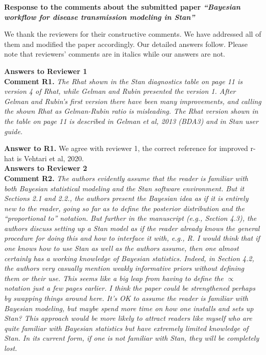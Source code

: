 \documentclass[12pt]{article}
\newcounter{question}
\newcommand{\name}{00}
\newcommand{\question}[1]{\stepcounter{question} \noindent \textbf{Comment \name.\thequestion} \emph{#1} }
\newcommand{\answer}[1]{\noindent \textbf{Answer to \name.\thequestion} #1 \mbox{}\\}
\newcommand{\newperson}[2]{\renewcommand{\name}{#2} \setcounter{question}{0} \newpage \noindent \textbf{\Large Answers to #1} \\}
\begin{document}
	
	{\large \textbf{Response to the comments about
			the submitted paper \emph{``Bayesian workflow for disease transmission modeling in
				Stan''
		}}}
	
	\vspace{3em}
	
	
	We thank the reviewers for their constructive comments. We have
	addressed all of them and modified the paper accordingly. Our
	detailed answers follow. 
	Please note that reviewers' comments are in italics while our
	answers are not. 
	
	
	\newperson{Reviewer 1}{R1}
	
%	
	
	\question{The Rhat shown in the Stan diagnostics table on page 11 is version 4 of Rhat, while Gelman and Rubin presented the version 1. After Gelman and Rubin's first version there have been many improvements, and calling the shown Rhat as Gelman-Rubin ratio is misleading. The Rhat version shown in the table on page 11 is described in Gelman et al, 2013 (BDA3) and in Stan user guide.}
	
	\answer{We agree with reviewer 1, the correct reference for improved r-hat is Vehtari et al, 2020.}
	
	\newperson{Reviewer 2}{R2}
	
	\question{The authors evidently assume that the reader is familiar with both Bayesian statistical
		modeling and the Stan software environment. But it Sections 2.1 and 2.2., the authors
		present the Bayesian idea as if it is entirely new to the reader, going so far as to
		define the posterior distribution and the “proportional to” notation. But further in the
		manuscript (e.g., Section 4.3), the authors discuss setting up a Stan model as if the
		reader already knows the general procedure for doing this and how to interface it with,
		e.g., R. I would think that if one knows how to use Stan as well as the authors assume,
		then one almost certainly has a working knowledge of Bayesian statistics. Indeed,
		in Section 4.2, the authors very casually mention weakly informative priors without
		defining them or their use. This seems like a big leap from having to define the $\propto$
		notation just a few pages earlier. I think the paper could be strengthened perhaps by
		swapping things around here. It’s OK to assume the reader is familiar with Bayesian
		modeling, but maybe spend more time on how one installs and sets up Stan? This
		approach would be more likely to attract readers like myself who are quite familiar
		with Bayesian statistics but have extremely limited knowledge of Stan. In its current
		form, if one is not familiar with Stan, they will be completely lost.}
	
\end{document}
